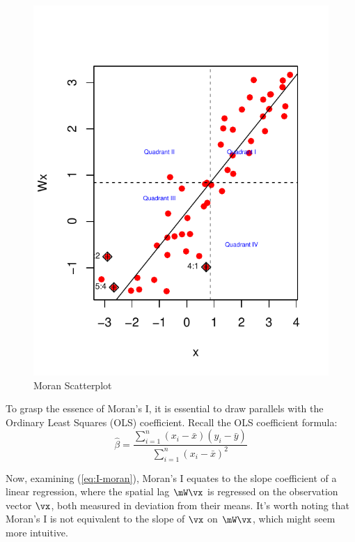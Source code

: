 \documentclass[english,12pt]{book}\usepackage[]{graphicx}\usepackage[]{xcolor}
\makeatletter
\def\maxwidth{ %
  \ifdim\Gin@nat@width>\linewidth
    \linewidth
  \else
    \Gin@nat@width
  \fi
}
\newenvironment{knitrout}{}{} %
\makeatother
\begin{document}
\begin{figure}[ht]
  \caption{Moran Scatterplot}\label{fig:moran_scatterplot}
\begin{knitrout}
\color{fgcolor}

{\centering \includegraphics[width=\maxwidth]{figure/moran-1} 

}


\end{knitrout}
\end{figure}


To grasp the essence of Moran's I, it is essential to draw parallels with the Ordinary Least Squares (OLS) coefficient. Recall the OLS coefficient formula:
\begin{equation*}
  \widehat{\beta}= \frac{\sum_{i = 1}^n\left(x_i - \bar{x}\right)(y_i - \bar{y})}{\sum_{i = 1}^n \left(x_i - \bar{x}\right)^2}
\end{equation*}

Now, examining (\ref{eq:I-moran}), Moran's I equates to the slope coefficient of a linear regression, where the spatial lag $\mW\vx$ is regressed on the observation vector $\vx$, both measured in deviation from their means. It's worth noting that Moran's I is not equivalent to the slope of $\vx$ on $\mW\vx$, which might seem more intuitive.
\end{document}
